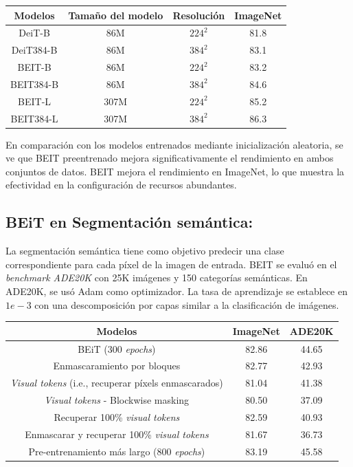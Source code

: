 \begin{center}
    \begin{tabular}{||c c c c ||} 
        \hline
        Modelos & Tamaño del modelo & Resolución & ImageNet \\ [0.5ex] 
        \hline\hline
        DeiT-B & 86M & $224^2$ & 81.8 \\ 
        \hline
        DeiT384-B & 86M & $384^2$ & 83.1 \\
        \hline
        BEIT-B & 86M & $224^2$ & 83.2 \\
        \hline
        BEIT384-B & 86M & $384^2$ & 84.6 \\
        \hline
        BEIT-L & 307M & $224^2$ & 85.2 \\
        \hline
        BEIT384-L & 307M & $384^2$ & 86.3 \\ [1ex] 
        \hline
    \end{tabular}
\end{center}

En comparación con los modelos entrenados mediante inicialización aleatoria, se ve que BEIT preentrenado mejora significativamente el rendimiento en ambos conjuntos de datos. BEIT mejora el rendimiento en ImageNet, lo que muestra la efectividad en la configuración de recursos abundantes.


\subsection{BEiT en Segmentación semántica:}
La segmentación semántica tiene como objetivo predecir una clase correspondiente para cada píxel de la imagen de entrada. BEIT  se evaluó en el \textit{benchmark ADE20K}  \parencite{94} con 25K imágenes y 150 categorías semánticas. En ADE20K, se usó Adam como optimizador. La tasa de aprendizaje se establece en $1e-3$ con una descomposición por capas similar a la clasificación de imágenes. 

\begin{center}
    \begin{tabular}{||c c c ||} 
        \hline
        Modelos & ImageNet & ADE20K \\ [0.5ex] 
        \hline\hline
        BEiT (300 \textit{epochs}) & 82.86 & 44.65 \\ 
        \hline
        Enmascaramiento por bloques & 82.77 & 42.93 \\
        \hline
        \textit{Visual tokens} (i.e., recuperar píxels enmascarados) & 81.04 & 41.38 \\
        \hline
        \textit{Visual tokens} - Blockwise masking & 80.50 & 37.09 \\
        \hline
        Recuperar 100\% \textit{visual tokens} & 82.59 & 40.93 \\
        \hline
        Enmascarar y recuperar 100\% \textit{visual tokens} & 81.67 & 36.73 \\
        \hline
        Pre-entrenamiento más largo (800 \textit{epochs}) & 83.19 & 45.58 \\ [1ex] 
        \hline
    \end{tabular}
\end{center}

